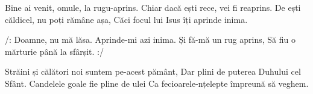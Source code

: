 \beginverse
Bine ai venit, omule, la rugu-aprins.
Chiar dacă ești rece, vei fi reaprins.
De ești căldicel, nu poți rămâne așa,
Căci focul lui Isus îți aprinde inima.
\endverse

\beginchorus
/: Doamne, nu mă lăsa.
Aprinde-mi azi inima.
Și fă-mă un rug aprins,
Să fiu o mărturie până la sfârșit. :/
\endchorus

\beginverse
Străini și călători noi suntem pe-acest pământ,
Dar plini de puterea Duhului cel Sfânt.
Candelele goale fie pline de ulei
Ca fecioarele-nțelepte împreună să veghem.
\endverse
\endsong